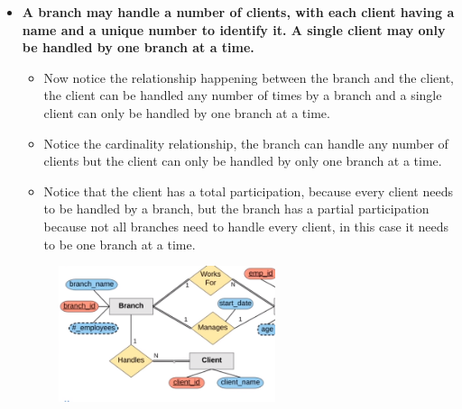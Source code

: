 \begin{itemize}
    \item \textbf{A branch may handle a number of clients, with each client having a name and a unique number to identify it. A single client may only be handled by one branch at a time.}
        \begin{itemize}
            \item Now notice the relationship happening between the branch and the client, the client can be handled any number of times by a branch and a single client can only be handled by one branch at a time.
            \item Notice the cardinality relationship, the branch can handle any number of clients but the client can only be handled by only one branch at a time.
            \item Notice that the client has a total participation, because every client needs to be handled by a branch, but the branch has a partial participation because not all branches need to handle every client, in this case it needs to be one branch at a time.
        \end{itemize}
        \begin{figure}[H]
            \centering
            \includegraphics[width=0.6\textwidth]{./Figs/2020-12-24-00-38-06.png}
        \end{figure}
    

\end{itemize}
